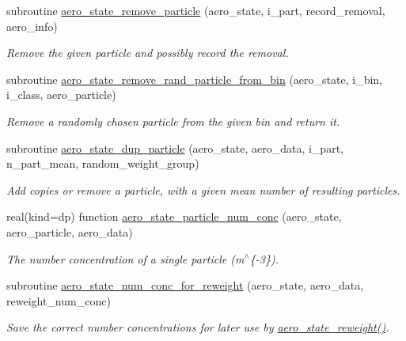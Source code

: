 \begin{DoxyCompactItemize}
subroutine \mbox{\hyperlink{namespacepmc__aero__state_ac19bda6a4cd1c2a3ea9f6cadf9dc9bb6}{aero\+\_\+state\+\_\+remove\+\_\+particle}} (aero\+\_\+state, i\+\_\+part, record\+\_\+removal, aero\+\_\+info)
\begin{DoxyCompactList}\small\item\em Remove the given particle and possibly record the removal. \end{DoxyCompactList}\item 
subroutine \mbox{\hyperlink{namespacepmc__aero__state_aabf1b375475462cc54740039ad556a83}{aero\+\_\+state\+\_\+remove\+\_\+rand\+\_\+particle\+\_\+from\+\_\+bin}} (aero\+\_\+state, i\+\_\+bin, i\+\_\+class, aero\+\_\+particle)
\begin{DoxyCompactList}\small\item\em Remove a randomly chosen particle from the given bin and return it. \end{DoxyCompactList}\item 
subroutine \mbox{\hyperlink{namespacepmc__aero__state_a4f965b4eaeeec1b01e2299016a3680cf}{aero\+\_\+state\+\_\+dup\+\_\+particle}} (aero\+\_\+state, aero\+\_\+data, i\+\_\+part, n\+\_\+part\+\_\+mean, random\+\_\+weight\+\_\+group)
\begin{DoxyCompactList}\small\item\em Add copies or remove a particle, with a given mean number of resulting particles. \end{DoxyCompactList}\item 
real(kind=dp) function \mbox{\hyperlink{namespacepmc__aero__state_a6e14396858e4011e0b36ebc5cd653bc2}{aero\+\_\+state\+\_\+particle\+\_\+num\+\_\+conc}} (aero\+\_\+state, aero\+\_\+particle, aero\+\_\+data)
\begin{DoxyCompactList}\small\item\em The number concentration of a single particle (m$^\wedge$\{-\/3\}). \end{DoxyCompactList}\item 
subroutine \mbox{\hyperlink{namespacepmc__aero__state_a08e7e95e0c08167046e3238693096dee}{aero\+\_\+state\+\_\+num\+\_\+conc\+\_\+for\+\_\+reweight}} (aero\+\_\+state, aero\+\_\+data, reweight\+\_\+num\+\_\+conc)
\begin{DoxyCompactList}\small\item\em Save the correct number concentrations for later use by \mbox{\hyperlink{namespacepmc__aero__state_a38c69c82e0dbc601557ff505d0513ba6}{aero\+\_\+state\+\_\+reweight()}}. \end{DoxyCompactList}\item 

\end{DoxyCompactItemize}
